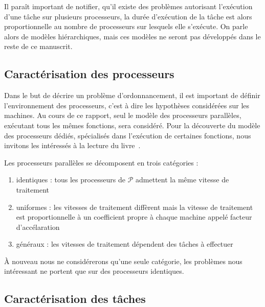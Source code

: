 \documentclass[a4paper,11pt]{article}
\begin{document}
Il paraît important de notifier, qu'il existe des problèmes autorisant l'exécution d'une tâche sur
plusieurs processeurs, la durée d'exécution de la tâche est alors proportionnelle au nombre de
processeurs sur lesquels elle s'exécute. On parle alors de modèles hiérarchiques, mais ces modèles
ne seront pas développés dans le reste de ce manuscrit.

\subsection{Caractérisation des processeurs}

Dans le but de décrire un problème d'ordonnancement, il est important de définir l'environnement des
processeurs, c'est à dire les hypothèses considérées sur les machines. Au cours de ce rapport, seul
le modèle des processeurs parallèles, exécutant tous les mêmes fonctions, sera considéré. Pour la
découverte du modèle des processeurs dédiés, spécialisés dans l'exécution de certaines fonctions,
nous invitons les intéressés à la lecture du livre~\cite{blazewicz_handbook_2007}.

Les processeurs parallèles se décomposent en trois catégories :
\begin{enumerate}
    \item identiques : tous les processeurs de $\mathcal{P}$ admettent la même vitesse de traitement
    \item uniformes : les vitesses de traitement diffèrent mais la vitesse de traitement est
        proportionnelle à un coefficient propre à chaque machine appelé facteur d'accélaration
    \item généraux : les vitesses de traitement dépendent des tâches à effectuer
\end{enumerate}

À nouveau nous ne considérerons qu'une seule catégorie, les problèmes nous intéressant ne portent
que sur des processeurs identiques.

\subsection{Caractérisation des tâches}
\end{document}
